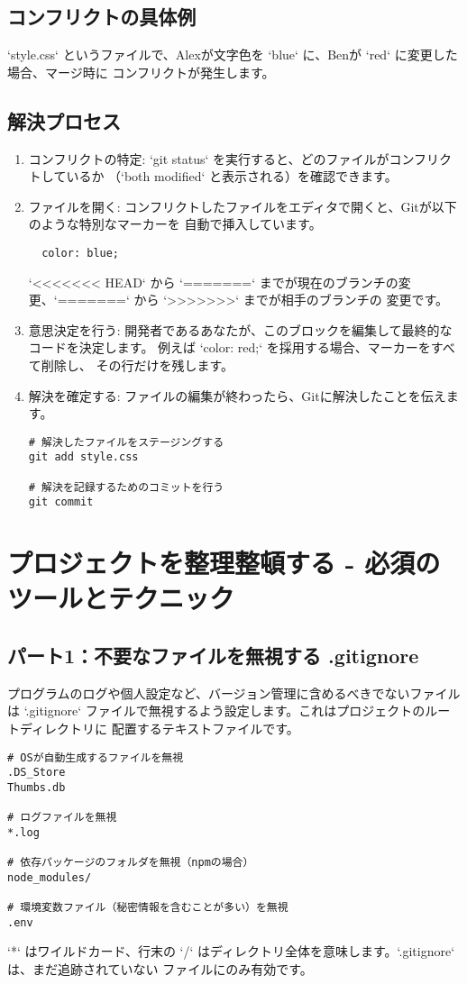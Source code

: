 \documentclass{ltjsarticle}
\begin{document}
\subsection{コンフリクトの具体例}
`style.css` というファイルで、Alexが文字色を `blue` に、Benが `red` に変更した場合、マージ時に
コンフリクトが発生します。

\subsection{解決プロセス}
\begin{enumerate}
    \item コンフリクトの特定: `git status` を実行すると、どのファイルがコンフリクトしているか
		（`both modified` と表示される）を確認できます。
    \item ファイルを開く: コンフリクトしたファイルをエディタで開くと、Gitが以下のような特別なマーカーを
		自動で挿入しています。
    \begin{verbatim}
  color: blue;
\end{verbatim}
    `<<<<<<< HEAD` から `=======` までが現在のブランチの変更、`=======` から `>>>>>>>` までが相手のブランチの
		変更です。
    \item 意思決定を行う: 開発者であるあなたが、このブロックを編集して最終的なコードを決定します。
		例えば `color: red;` を採用する場合、マーカーをすべて削除し、
    その行だけを残します。
    \item 解決を確定する: ファイルの編集が終わったら、Gitに解決したことを伝えます。
    \begin{verbatim}
# 解決したファイルをステージングする
git add style.css

# 解決を記録するためのコミットを行う
git commit
\end{verbatim}
\end{enumerate}

\section{プロジェクトを整理整頓する - 必須のツールとテクニック}
\subsection{パート1：不要なファイルを無視する .gitignore}
プログラムのログや個人設定など、バージョン管理に含めるべきでないファイルは `.gitignore` 
ファイルで無視するよう設定します。これはプロジェクトのルートディレクトリに
配置するテキストファイルです。
\begin{verbatim}
# OSが自動生成するファイルを無視
.DS_Store
Thumbs.db

# ログファイルを無視
*.log

# 依存パッケージのフォルダを無視（npmの場合）
node_modules/

# 環境変数ファイル（秘密情報を含むことが多い）を無視
.env
\end{verbatim}
`*` はワイルドカード、行末の `/` はディレクトリ全体を意味します。`.gitignore` は、まだ追跡されていない
ファイルにのみ有効です。
\end{document}
